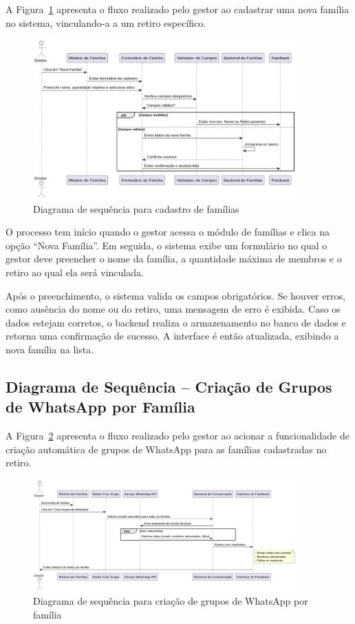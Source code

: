 A Figura~\ref{fig:familyCreate} apresenta o fluxo realizado pelo gestor ao cadastrar uma nova família no sistema, vinculando-a a um retiro específico.

\begin{figure}[H]
    \centering
    \includegraphics[width=0.9\textwidth]{images/diagramasdesequencias/familyRegister.png}
    \caption{Diagrama de sequência para cadastro de famílias}
    \label{fig:familyCreate}
\end{figure}

O processo tem início quando o gestor acessa o módulo de famílias e clica na opção “Nova Família”. Em seguida, o sistema exibe um formulário no qual o gestor deve preencher o nome da família, a quantidade máxima de membros e o retiro ao qual ela será vinculada.

Após o preenchimento, o sistema valida os campos obrigatórios. Se houver erros, como ausência do nome ou do retiro, uma mensagem de erro é exibida. Caso os dados estejam corretos, o backend realiza o armazenamento no banco de dados e retorna uma confirmação de sucesso. A interface é então atualizada, exibindo a nova família na lista.

\subsection{Diagrama de Sequência – Criação de Grupos de WhatsApp por Família}

A Figura~\ref{fig:familyWhatsappGroup} apresenta o fluxo realizado pelo gestor ao acionar a funcionalidade de criação automática de grupos de WhatsApp para as famílias cadastradas no retiro.

\begin{figure}[H]
    \centering
    \includegraphics[width=0.9\textwidth]{images/diagramasdesequencias/familyWpGroup.png}
    \caption{Diagrama de sequência para criação de grupos de WhatsApp por família}
    \label{fig:familyWhatsappGroup}
\end{figure}

